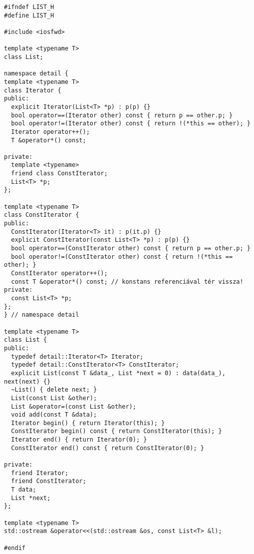 \documentclass[../cpp_book/cpp_book.tex]{subfiles}
\begin{document}
\begin{lstlisting}
#ifndef LIST_H
#define LIST_H

#include <iosfwd>

template <typename T>
class List;

namespace detail {
template <typename T>
class Iterator {
public:
  explicit Iterator(List<T> *p) : p(p) {}
  bool operator==(Iterator other) const { return p == other.p; }
  bool operator!=(Iterator other) const { return !(*this == other); }
  Iterator operator++();
  T &operator*() const;

private:
  template <typename>
  friend class ConstIterator;
  List<T> *p;
};

template <typename T>
class ConstIterator {
public:
  ConstIterator(Iterator<T> it) : p(it.p) {}
  explicit ConstIterator(const List<T> *p) : p(p) {}
  bool operator==(ConstIterator other) const { return p == other.p; }
  bool operator!=(ConstIterator other) const { return !(*this == other); }
  ConstIterator operator++();
  const T &operator*() const; // konstans referenciával tér vissza!
private:
  const List<T> *p;
};
} // namespace detail

template <typename T>
class List {
public:
  typedef detail::Iterator<T> Iterator;
  typedef detail::ConstIterator<T> ConstIterator;
  explicit List(const T &data_, List *next = 0) : data(data_), next(next) {}
  ~List() { delete next; }
  List(const List &other);
  List &operator=(const List &other);
  void add(const T &data);
  Iterator begin() { return Iterator(this); }
  ConstIterator begin() const { return ConstIterator(this); }
  Iterator end() { return Iterator(0); }
  ConstIterator end() const { return ConstIterator(0); }

private:
  friend Iterator;
  friend ConstIterator;
  T data;
  List *next;
};

template <typename T>
std::ostream &operator<<(std::ostream &os, const List<T> &l);

#endif
\end{lstlisting}
\end{document}
